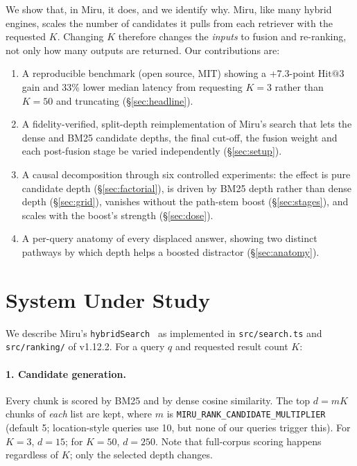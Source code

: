 \documentclass[11pt, letterpaper]{article}
\makeatletter
\newcommand{\hit}{\mathrm{Hit@3}}
\newcommand{\code}[1]{\texttt{#1}}
\makeatother
\begin{document}
We show that, in Miru, it does, and we identify why. Miru, like many hybrid engines, scales the number of candidates
it pulls from each retriever with the requested $K$. Changing $K$ therefore changes the \emph{inputs} to fusion and
re-ranking, not only how many outputs are returned. Our contributions are:
\begin{enumerate}
  \item A reproducible benchmark (open source, MIT) showing a +7.3-point $\hit$ gain and 33\% lower median latency
        from requesting $K{=}3$ rather than $K{=}50$ and truncating (\S\ref{sec:headline}).
  \item A fidelity-verified, split-depth reimplementation of Miru's search that lets the dense and BM25 candidate
        depths, the final cut-off, the fusion weight and each post-fusion stage be varied independently
        (\S\ref{sec:setup}).
  \item A causal decomposition through six controlled experiments: the effect is pure candidate depth
        (\S\ref{sec:factorial}), is driven by BM25 depth rather than dense depth (\S\ref{sec:grid}), vanishes without the
        path-stem boost (\S\ref{sec:stages}), and scales with the boost's strength (\S\ref{sec:dose}).
  \item A per-query anatomy of every displaced answer, showing two distinct pathways by which depth helps a boosted
        distractor (\S\ref{sec:anatomy}).
\end{enumerate}

\section{System Under Study}\label{sec:system}
We describe Miru's \code{hybridSearch}~\cite{miru} as implemented in \code{src/search.ts} and \code{src/ranking/} of v1.12.2.
For a query $q$ and requested result count $K$:

\paragraph{1. Candidate generation.} Every chunk is scored by BM25 and by dense cosine similarity. The top
$d = mK$ chunks of \emph{each} list are kept, where $m$ is \code{MIRU\_RANK\_CANDIDATE\_MULTIPLIER} (default 5;
location-style queries use 10, but none of our queries trigger this). For $K{=}3$, $d{=}15$; for $K{=}50$, $d{=}250$.
Note that full-corpus scoring happens regardless of $K$; only the selected depth changes.
\end{document}
